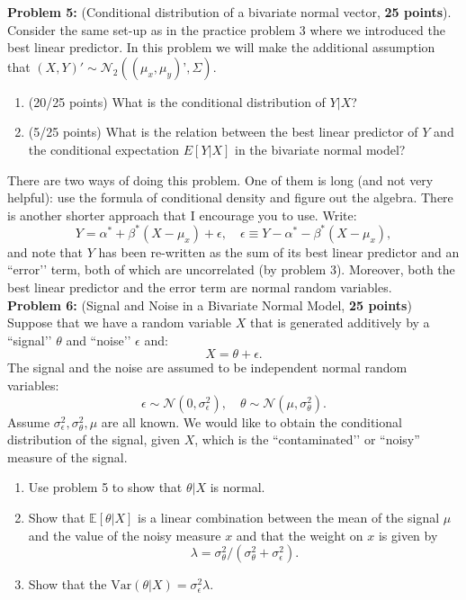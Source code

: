 \documentclass[11pt]{article} %
\begin{document}
\noindent \textbf{Problem 5:} (Conditional distribution of a bivariate normal vector, \textbf{25 points}). Consider the same set-up as in the practice problem 3 where we introduced the best linear predictor. In this problem we will make the additional assumption that $(X,Y)' \sim \mathcal{N}_2((\mu_x, \mu_y)’, \Sigma)$. 

\begin{enumerate}
\item (20/25 points) What is the conditional distribution of $Y | X$?
\item (5/25 points) What is the relation between the best linear predictor of $Y$ and the conditional expectation $E[Y|X]$ in the bivariate normal model? 
\end{enumerate}
 There are two ways of doing this problem. One of them is long (and not very helpful): use the formula of conditional density and figure out the algebra. There is another shorter approach that I encourage you to use. Write:
\[  Y = \alpha^* + \beta^*(X-\mu_x) + \epsilon, \quad \epsilon \equiv Y - \alpha^*-\beta^*(X-\mu_x), \]
and note that $Y$ has been re-written as the sum of its best linear predictor and an ``error’’ term, both of which are uncorrelated (by problem 3). Moreover, both the best linear predictor and the error term are normal random variables. \\

\noindent \textbf{Problem 6:} (Signal and Noise in a Bivariate Normal Model, \textbf{25 points}) Suppose that we have a random variable $X$ that is generated additively by  a ``signal’’ $\theta$ and ``noise’’ $\epsilon$ and:
\[X = \theta + \epsilon.\]
The signal and the noise are assumed to be independent normal random variables:
\[ \epsilon \sim \mathcal{N}(0, \sigma^2_{\epsilon}), \quad \theta \sim \mathcal{N}(\mu, \sigma^2_{\theta}). \]
Assume $\sigma^2_{\epsilon}, \sigma^2_{\theta}, \mu$ are all known. We would like to obtain the conditional distribution of the signal, given $X$, which is the ``contaminated’’ or ``noisy” measure of the signal. 
\begin{enumerate}
\item Use problem 5 to show that $\theta | X$ is normal. \\
\item Show that $\mathbb{E}[\theta | X]$ is a linear combination between the mean of the signal $\mu$ and the value of the noisy measure $x$ and that the weight on $x$ is given by
\[\lambda = \sigma^2_{\theta} / (\sigma^2_{\theta} + \sigma^2_{\epsilon}).\]
\item Show that the $\textrm{Var}(\theta | X) = \sigma^2_{\epsilon} \lambda.$
\end{enumerate}









\end{document}
